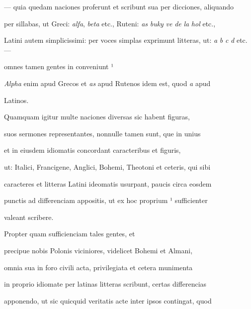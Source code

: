 — quia quedam naciones proferunt et scribunt sua per dicciones, aliquando

per sillabas, ut Greci: \textit{alfa}, \textit{beta} etc., Ruteni: \textit{as} \textit{buky} \textit{ve} \textit{de} \textit{la} \textit{hol} etc.,

Latini autem simplicissimi: per voces simplas exprimunt litteras, ut: \textit{a} \textit{b} \textit{c} \textit{d} etc. —



omnes tamen gentes in  conveniunt  ¹

\textit{Alpha} enim apud Grecos et \textit{as} apud Rutenos idem est, quod \textit{a} apud

\splitlines{}

Latinos.

\indentK Quamquam igitur multe naciones diversas sic habent figuras,

\fulllines{}

suos sermones representantes, nonnulle tamen sunt, que in unius

et in eiusdem idiomatis concordant caracteribus et figuris,

ut: Italici, Francigene, Anglici, Bohemi, Theotoni et ceteris, qui sibi

caracteres et litteras Latini ideomatis usurpant, paucis circa eosdem

punctis ad differenciam appositis, ut ex hoc proprium ¹ sufficienter

\splitlines{}


valeant scribere.

\indentK Propter quam sufficienciam tales gentes, et

\fulllines{}

precipue nobis Polonis viciniores, videlicet Bohemi et Almani,

omnia sua in foro civili acta, privilegiata et cetera munimenta

in proprio idiomate per latinas litteras scribunt, certas differencias

apponendo, ut sic quicquid veritatis acte inter ipsos contingat, quod

